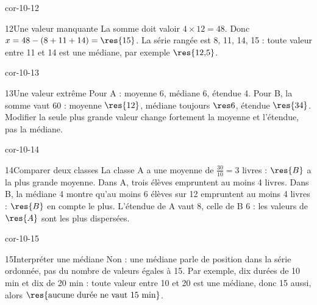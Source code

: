 \begin{blocLivre}{cor-10-12}\begin{corrige}{12}{Une valeur manquante}
La somme doit valoir $4\times12=48$. Donc $x=48-(8+11+14)=\res{15}$. La série rangée est 8, 11, 14, 15 : toute valeur entre 11 et 14 est une médiane, par exemple $\res{12{,}5}$.
\end{corrige}\end{blocLivre}
\begin{blocLivre}{cor-10-13}\begin{corrige}{13}{Une valeur extrême}
Pour A : moyenne 6, médiane 6, étendue 4. Pour B, la somme vaut 60 : moyenne $\res{12}$, médiane toujours $\res6$, étendue $\res{34}$. Modifier la seule plus grande valeur change fortement la moyenne et l’étendue, pas la médiane.
\end{corrige}\end{blocLivre}
\begin{blocLivre}{cor-10-14}\begin{corrige}{14}{Comparer deux classes}
La classe A a une moyenne de $\frac{30}{10}=3$ livres : $\res{B}$ a la plus grande moyenne. Dans A, trois élèves empruntent au moins 4 livres. Dans B, la médiane 4 montre qu’au moins 6 élèves sur 12 empruntent au moins 4 livres : $\res{B}$ en compte le plus. L’étendue de A vaut 8, celle de B 6 : les valeurs de $\res{A}$ sont les plus dispersées.
\end{corrige}\end{blocLivre}
\begin{blocLivre}{cor-10-15}\begin{corrige}{15}{Interpréter une médiane}
Non : une médiane parle de position dans la série ordonnée, pas du nombre de valeurs égales à 15. Par exemple, dix durées de 10 min et dix de 20 min : toute valeur entre 10 et 20 est une médiane, donc 15 aussi, alors $\res{\text{aucune durée ne vaut 15 min}}$.
\end{corrige}\end{blocLivre}
